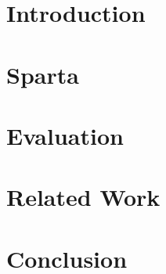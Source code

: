 \documentclass[runningheads]{llncs}
\begin{document}
\section{Introduction}
\label{sec:intro}


\section{Sparta}
\label{sec:Sparta}


\section{Evaluation}
\label{sec:eval}


\section{Related Work}
\label{sec:relate_work}


\section{Conclusion}
\label{sec:conclusion}



%
%
%


% 
\end{document}
